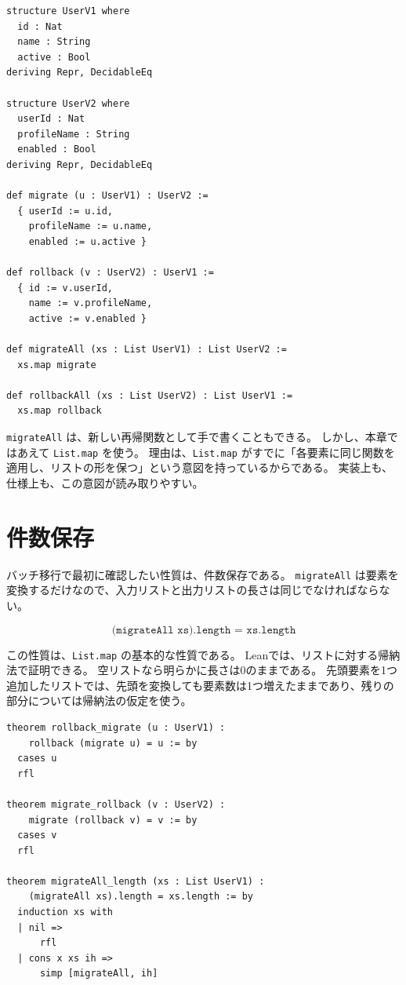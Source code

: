 \begin{listing}[htbp]
\begin{verbatim}
structure UserV1 where
  id : Nat
  name : String
  active : Bool
deriving Repr, DecidableEq

structure UserV2 where
  userId : Nat
  profileName : String
  enabled : Bool
deriving Repr, DecidableEq

def migrate (u : UserV1) : UserV2 :=
  { userId := u.id,
    profileName := u.name,
    enabled := u.active }

def rollback (v : UserV2) : UserV1 :=
  { id := v.userId,
    name := v.profileName,
    active := v.enabled }

def migrateAll (xs : List UserV1) : List UserV2 :=
  xs.map migrate

def rollbackAll (xs : List UserV2) : List UserV1 :=
  xs.map rollback
\end{verbatim}
\caption{1件の移行とリスト全体の移行}
\label{lst:ch24-domain-model}
\end{listing}

\texttt{migrateAll} は、新しい再帰関数として手で書くこともできる。
しかし、本章ではあえて \texttt{List.map} を使う。
理由は、\texttt{List.map} がすでに「各要素に同じ関数を適用し、リストの形を保つ」という意図を持っているからである。
実装上も、仕様上も、この意図が読み取りやすい。

\section{件数保存}

バッチ移行で最初に確認したい性質は、件数保存である。
\texttt{migrateAll} は要素を変換するだけなので、入力リストと出力リストの長さは同じでなければならない。

\[
  \texttt{(migrateAll xs).length = xs.length}
\]

この性質は、\texttt{List.map} の基本的な性質である。
Leanでは、リストに対する帰納法で証明できる。
空リストなら明らかに長さは0のままである。
先頭要素を1つ追加したリストでは、先頭を変換しても要素数は1つ増えたままであり、残りの部分については帰納法の仮定を使う。

\begin{listing}[htbp]
\begin{verbatim}
theorem rollback_migrate (u : UserV1) :
    rollback (migrate u) = u := by
  cases u
  rfl

theorem migrate_rollback (v : UserV2) :
    migrate (rollback v) = v := by
  cases v
  rfl

theorem migrateAll_length (xs : List UserV1) :
    (migrateAll xs).length = xs.length := by
  induction xs with
  | nil =>
      rfl
  | cons x xs ih =>
      simp [migrateAll, ih]
\end{verbatim}
\caption{1件の round-trip と件数保存}
\label{lst:ch24-length-preservation}
\end{listing}

